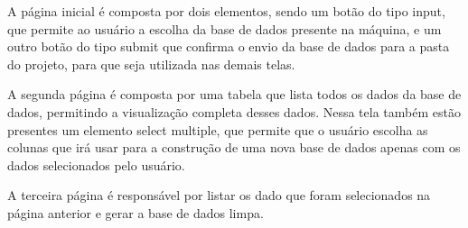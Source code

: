 A página inicial é composta por dois elementos, sendo um botão do tipo input, que permite ao usuário a escolha da base de dados presente na máquina, e um outro botão do tipo submit que confirma o envio da base de dados para a pasta do projeto, para que seja utilizada nas demais telas.

A segunda página é composta por uma tabela que lista todos os dados da base de dados, permitindo a visualização completa desses dados. Nessa tela também estão presentes um elemento select multiple, que permite que o usuário escolha as colunas que irá usar para a construção de uma nova base de dados apenas com os dados selecionados pelo usuário.

A terceira página é responsável por listar os dado que foram selecionados na página anterior e gerar a base de dados limpa.

